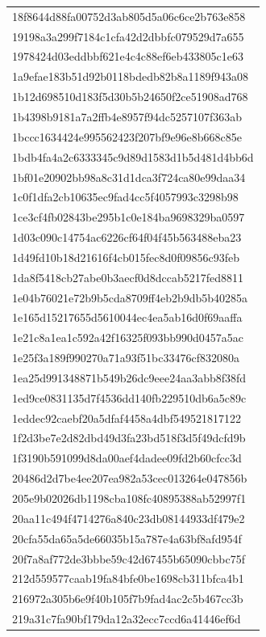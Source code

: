 \begin{tabular}{l}
18f8644d88fa00752d3ab805d5a06c6ce2b763e858 \\
19198a3a299f7184c1cfa42d2dbbfc079529d7a655 \\
1978424d03eddbbf621e4c4c88ef6eb433805c1e63 \\
1a9efae183b51d92b0118bdedb82b8a1189f943a08 \\
1b12d698510d183f5d30b5b24650f2ce51908ad768 \\
1b4398b9181a7a2ffb4e8957f94dc5257107f363ab \\
1bccc1634424e995562423f207bf9e96e8b668c85e \\
1bdb4fa4a2c6333345c9d89d1583d1b5d481d4bb6d \\
1bf01e20902bb98a8c31d1dca3f724ca80e99daa34 \\
1c0f1dfa2cb10635ec9fad4cc5f4057993c3298b98 \\
1ce3cf4fb02843be295b1c0e184ba9698329ba0597 \\
1d03c090c14754ac6226cf64f04f45b563488eba23 \\
1d49fd10b18d21616f4cb015fec8d0f09856c93feb \\
1da8f5418cb27abe0b3aecf0d8dccab5217fed8811 \\
1e04b76021e72b9b5cda8709ff4eb2b9db5b40285a \\
1e165d15217655d5610044ec4ea5ab16d0f69aaffa \\
1e21c8a1ea1c592a42f16325f093bb990d0457a5ac \\
1e25f3a189f990270a71a93f51bc33476cf832080a \\
1ea25d991348871b549b26dc9eee24aa3abb8f38fd \\
1ed9ce0831135d7f4536dd140fb229510db6a5c89c \\
1eddec92caebf20a5dfaf4458a4dbf549521817122 \\
1f2d3be7e2d82dbd49d3fa23bd518f3d5f49dcfd9b \\
1f3190b591099d8da00aef4dadee09fd2b60cfcc3d \\
20486d2d7be4ee207ea982a53cec013264e047856b \\
205e9b02026db1198cba108fc40895388ab52997f1 \\
20aa11c494f4714276a840c23db08144933df479e2 \\
20cfa55da65a5de66035b15a787e4a63bf8afd954f \\
20f7a8af772de3bbbe59c42d67455b65090cbbc75f \\
212d559577caab19fa84bfe0be1698cb311bfca4b1 \\
216972a305b6e9f40b105f7b9fad4ac2c5b467cc3b \\
219a31c7fa90bf179da12a32ecc7ccd6a41446ef6d \\

\end{tabular}
